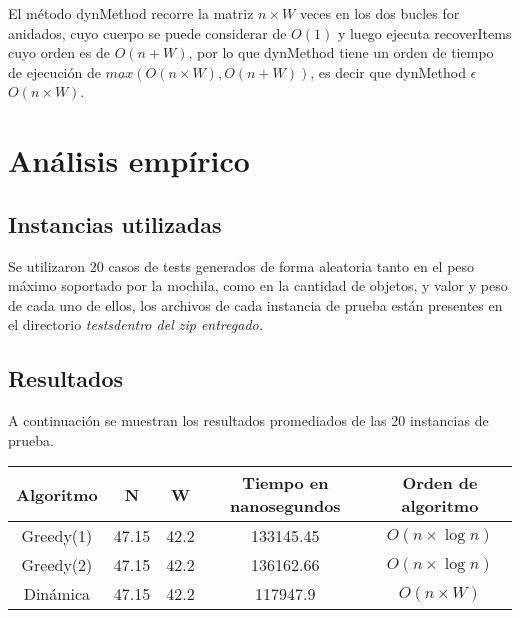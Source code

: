 \documentclass[a4paper,10pt,spanish]{article}
\begin{document}
	El m\'etodo dynMethod recorre la matriz $n\times W$ veces en los dos bucles for anidados, cuyo cuerpo se puede considerar de $O(1)$ y luego ejecuta recoverItems cuyo orden es de $O(n + W)$, por lo que dynMethod tiene un orden de tiempo de ejecuci\'on de $max(O(n\times W), O(n + W))$, es decir que dynMethod $\epsilon$ $O(n\times W)$.

\newpage
\section{An\'alisis emp\'irico}

	\subsection{Instancias utilizadas}
	
	Se utilizaron 20 casos de tests generados de forma aleatoria tanto en el peso m\'aximo soportado por la mochila, como en la cantidad de objetos, y valor y peso de cada uno de ellos, los archivos de cada instancia de prueba est\'an presentes en el directorio \em tests\em  dentro del zip entregado.
	
	\subsection{Resultados}
	\label{res}
	A continuaci\'on se muestran los resultados promediados de las 20 instancias de prueba.
	
	\vspace{5 mm}
	\begin{tabular}{ | c | c | c | c | c |}
	\hline
	 Algoritmo & N & W & Tiempo en nanosegundos & Orden de algoritmo \\ \hline
	 Greedy(1) & 47.15 & 42.2 & 133145.45 & $O(n\times \log n)$\\ \hline
	 Greedy(2) & 47.15 & 42.2 & 136162.66 & $O(n\times \log n)$\\ \hline
	 Din\'amica & 47.15 & 42.2 & 117947.9 & $O(n\times W)$\\ \hline
	\end{tabular}
	
\end{document}
